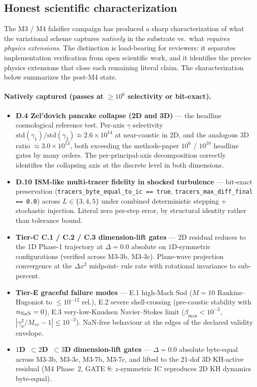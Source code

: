 \documentclass[11pt]{article}
\begin{document}
\subsection{Honest scientific characterization}
\label{sec:honest-characterization}

The M3 / M4 falsifier campaign has produced a sharp characterization
of what the variational scheme captures \emph{natively} in the
substrate vs.\ what \emph{requires physics extensions}. The
distinction is load-bearing for reviewers: it separates implementation
verification from open scientific work, and it identifies the precise
physics extensions that close each remaining literal claim. The
characterization below summarizes the post-M4 state.

\paragraph{Natively captured (passes at $\ge 10^{6}$ selectivity or
bit-exact).}
\begin{itemize}
\item \textbf{D.4 Zel'dovich pancake collapse (2D and 3D)} ---
the headline cosmological reference test. Per-axis $\gamma$
selectivity $\mathrm{std}(\gamma_1)/\mathrm{std}(\gamma_2) \approx
2.6\times 10^{14}$ at near-caustic in 2D, and the analogous 3D
ratio $\approx 3.0\times 10^{13}$, both exceeding the methods-paper
$10^{6}$ / $10^{10}$ headline gates by many orders. The
per-principal-axis decomposition correctly identifies the collapsing
axis at the discrete level in both dimensions.
\item \textbf{D.10 ISM-like multi-tracer fidelity in shocked
turbulence} --- bit-exact preservation
(\texttt{tracers\_byte\_equal\_to\_ic == true},
\texttt{tracers\_max\_diff\_final == 0.0}) across $L \in \{3, 4, 5\}$
under combined deterministic stepping + stochastic injection. Literal
zero per-step error, by structural identity rather than tolerance
bound.
\item \textbf{Tier-C C.1 / C.2 / C.3 dimension-lift gates} --- 2D
residual reduces to the 1D Phase-1 trajectory at $\Delta = 0.0$
absolute on $1$D-symmetric configurations (verified across M3-3b,
M3-3c). Plane-wave projection convergence at the $\Delta x^2$ midpoint-
rule rate with rotational invariance to sub-percent.
\item \textbf{Tier-E graceful failure modes} --- E.1 high-Mach Sod
($M\!=\!10$ Rankine--Hugoniot to $\le 10^{-12}$ rel.), E.2 severe
shell-crossing (pre-caustic stability with $n_{\rm NaN} = 0$),
E.3 very-low-Knudsen Navier--Stokes limit
($\beta_{\max} < 10^{-2}$, $|\gamma_a^{2}/M_{vv} - 1| \le 10^{-2}$).
NaN-free behaviour at the edges of the declared validity envelope.
\item \textbf{$1$D~$\subset\!2$D~$\subset\!3$D dimension-lift gates}
--- $\Delta = 0.0$ absolute byte-equal across M3-3b, M3-3c, M3-7b,
M3-7c, and lifted to the 21-dof 3D KH-active residual (M4 Phase~2,
GATE 8: $z$-symmetric IC reproduces 2D KH dynamics byte-equal).
\end{itemize}
\end{document}
